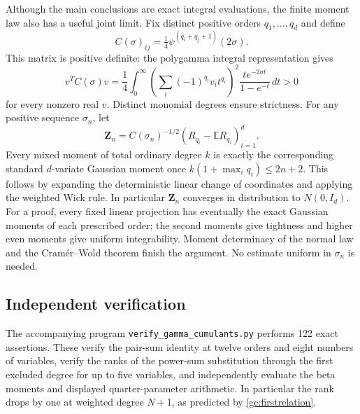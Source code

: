 \documentclass[11pt,a4paper]{article}
\numberwithin{equation}{section}
\theoremstyle{definition}
\theoremstyle{remark}
\begin{document}
Although the main conclusions are exact integral evaluations, the
finite moment law also has a useful joint limit. Fix distinct positive
orders $q_1,\ldots,q_d$ and define
\[
 C(\sigma)_{ij}=\tfrac14\psi^{(q_i+q_j+1)}(2\sigma).
\]
This matrix is positive definite: the polygamma integral representation
gives
\[
 v^TC(\sigma)v
 =\frac14\int_0^\infty
       \left(\sum_i(-1)^{q_i}v_i t^{q_i}\right)^2
                    \frac{t e^{-2\sigma t}}{1-e^{-t}}\,dt>0
\]
for every nonzero real $v$. Distinct monomial degrees ensure strictness.
For any positive sequence $\sigma_n$, let
\[
 \mathbf Z_n=C(\sigma_n)^{-1/2}
       (R_{q_i}-\mathbb ER_{q_i})_{i=1}^d.
\]
Every mixed moment of total ordinary degree $k$ is exactly the
corresponding standard $d$-variate Gaussian moment once
$k(1+\max_iq_i)\le2n+2$. This follows by expanding the deterministic
linear change of coordinates and applying the weighted Wick rule.
In particular $\mathbf Z_n$ converges in distribution to $N(0,I_d)$.
For a proof, every fixed linear projection has eventually the exact
Gaussian moments of each prescribed order; the second moments give
tightness and higher even moments give uniform integrability.
Moment determinacy of the normal law and the Cram\'er--Wold theorem
finish the argument. No estimate uniform in $\sigma_n$ is needed.

\subsection{Independent verification}

The accompanying program \texttt{verify\_gamma\_cumulants.py} performs
122 exact assertions. These verify the pair-sum identity at twelve
orders and eight numbers of variables, verify the ranks of the
power-sum substitution through the first excluded degree for up to five
variables, and independently evaluate the beta moments and displayed
quarter-parameter arithmetic. In particular the rank drops by one at
weighted degree $N+1$, as predicted by \eqref{gc:firstrelation}.
\end{document}
